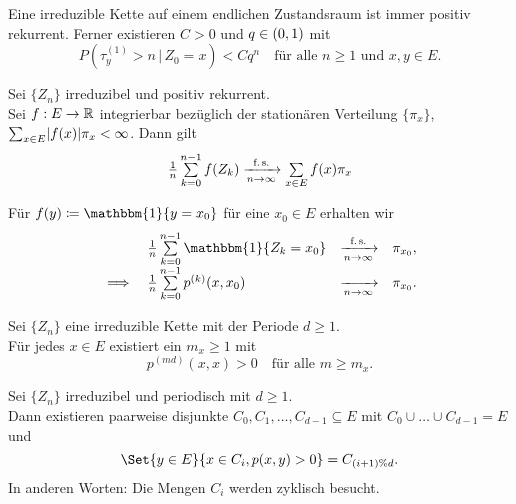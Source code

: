 \documentclass{cheat-sheet}
\newcommand{\ind}{\mathbbm{1}} %
\newcommand{\Defn}[1]{\textcolor{DefinitionColor}{#1}}
\begin{document}

\begin{satz}
  Eine irreduzible Kette auf einem endlichen Zustandsraum ist immer positiv rekurrent.
  Ferner existieren $C > 0$ und $q \in \left( 0, 1 \right)$ mit
  \[
    P(\tau_y^{(1)} > n \,|\, Z_0 = x) < C q^n
    \quad \text{für alle $n \geq 1$ und $x, y \in E$.}
  \]
\end{satz}

\begin{satz}
  Sei $\{ Z_n \}$ irreduzibel und positiv rekurrent. \\
  Sei $f : E \to \mathbb{R}$ integrierbar bezüglich der stationären Verteilung $\{ \pi_x \}$, \dh{} ${\sum}_{x \in E} \abs{f(x)} \pi_x < \infty$.
  Dann gilt
  \[
    \tfrac{1}{n} \sum_{k=0}^{n-1} f(Z_k) \xrightarrow[n \to \infty]{\text{f.\,s.}} \sum_{x \in E} f(x) \pi_x
  \]
\end{satz}


\begin{bsp}
  Für $f(y) \coloneqq \ind \{ y = x_0 \}$ für eine $x_0 \in E$ erhalten wir
  \[
    \begin{array}{r l c l}
      & \tfrac{1}{n} \sum_{k=0}^{n-1} \ind \{ Z_k = x_0 \} &\xrightarrow[n \to \infty]{\text{f.\,s.}}& \pi_{x_0}, \\
      \implies & \tfrac{1}{n} \sum_{k=0}^{n-1} p^{(k)}(x, x_0) &\xrightarrow[n \to \infty]{}& \pi_{x_0}.
    \end{array}
  \]
\end{bsp}


\begin{lem}
  Sei $\{ Z_n \}$ eine irreduzible Kette mit der Periode $d \geq 1$. \\
  Für jedes $x \in E$ existiert ein $m_x \geq 1$ mit
  \[
    p^{(md)}(x, x) > 0 \quad
    \text{für alle $m \geq m_x$.}
  \]
\end{lem}


\begin{prop}
  Sei $\{ Z_n \}$ irreduzibel und periodisch mit $d \geq 1$. \\
  Dann existieren paarweise disjunkte $C_0, C_1, \ldots, C_{d-1} \subseteq E$ mit $C_0 \cup \ldots \cup C_{d-1} = E$ und
  \[
    \Set{y \in E}{x \in C_i, p(x, y) > 0} = C_{(i+1) \% d}.
  \]
  In anderen Worten: Die Mengen $C_i$ werden zyklisch besucht.
\end{prop}
\end{document}
